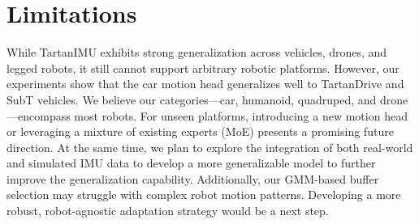 \section{Limitations}
While TartanIMU exhibits strong generalization across vehicles, drones, and legged robots, it still cannot support arbitrary robotic platforms. However, our experiments show that the car motion head generalizes well to TartanDrive and SubT vehicles. We believe our categories—car, humanoid, quadruped, and drone—encompass most robots. For unseen platforms, introducing a new motion head or leveraging a mixture of existing experts (MoE)\cite{moe} presents a promising future direction. At the same time, we plan to explore the integration of both real-world and simulated IMU data to develop a more generalizable model to further improve the generalization capability. Additionally, our GMM-based buffer selection may struggle with complex robot motion patterns. Developing a more robust, robot-agnostic adaptation strategy would be a next step. 
